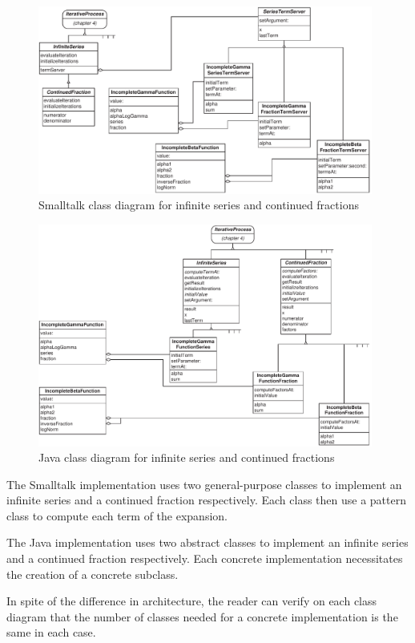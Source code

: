 \documentclass[twoside]{book}
\begin{document}
\begin{figure}
\centering\includegraphics[width=11cm]{Figures/SeriesClassDiagram}
\caption{Smalltalk class diagram for infinite series and continued
fractions}\label{fig:StSeriesClass}
\end{figure}
\begin{figure}
\centering\includegraphics[width=11cm]{Figures/SeriesClassDiagramJ}
\caption{Java class diagram for infinite series and continued
fractions}\label{fig:JvSeriesClass}
\end{figure}

The Smalltalk implementation uses two general-purpose classes to
implement an infinite series and a continued fraction
respectively. Each class then use a  pattern
class \cite{GoF} to compute each term of the expansion.

The Java implementation uses two abstract classes to implement an
infinite series and a continued fraction respectively. Each
concrete implementation necessitates the creation of a concrete
subclass.

In spite of the difference in architecture, the reader can verify
on each class diagram that the number of classes needed for a
concrete implementation is the same in each case.
\end{document}

